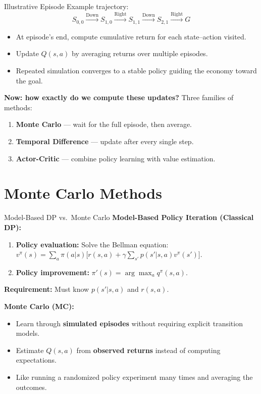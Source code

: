 \documentclass[10pt,english,aspectratio=169]{beamer}
\begin{document}
\begin{frame}{Illustrative Episode}
Example trajectory:
\[
S_{0,0}\xrightarrow{\text{Down}}S_{1,0}\xrightarrow{\text{Right}}S_{1,1}\xrightarrow{\text{Down}}S_{2,1}\xrightarrow{\text{Right}}G
\]

\begin{itemize}
    \item At episode's end, compute cumulative return for each state--action visited.
    \item Update $Q(s,a)$ by averaging returns over multiple episodes.
    \item Repeated simulation converges to a stable policy guiding the economy toward the goal.
\end{itemize}

\vspace{0.3cm}
\textbf{Now: how exactly do we compute these updates?} Three families of methods:
\begin{enumerate}
    \item \textbf{Monte Carlo} --- wait for the full episode, then average.
    \item \textbf{Temporal Difference} --- update after every single step.
    \item \textbf{Actor-Critic} --- combine policy learning with value estimation.
\end{enumerate}
\end{frame}


\section{Monte Carlo Methods}

\begin{frame}{Model-Based DP vs.\ Monte Carlo}
\textbf{Model-Based Policy Iteration (Classical DP):}
\begin{enumerate}
    \item \textbf{Policy evaluation:} Solve the Bellman equation:
    $v^\pi(s) = \sum_{a} \pi(a|s) \bigl[r(s,a) + \gamma \sum_{s'} p(s'|s,a) v^\pi(s')\bigr]$.
    \item \textbf{Policy improvement:}
    $\pi'(s) = \arg\max_a q^\pi(s,a)$.
\end{enumerate}
\textbf{Requirement:} Must know $p(s'|s,a)$ and $r(s,a)$.

\vspace{0.3cm}
\textbf{Monte Carlo (MC):}
\begin{itemize}
    \item Learn through \textbf{simulated episodes} without requiring explicit transition models.
    \item Estimate $Q(s,a)$ from \textbf{observed returns} instead of computing expectations.
    \item Like running a randomized policy experiment many times and averaging the outcomes.
\end{itemize}
\end{frame}
\end{document}
